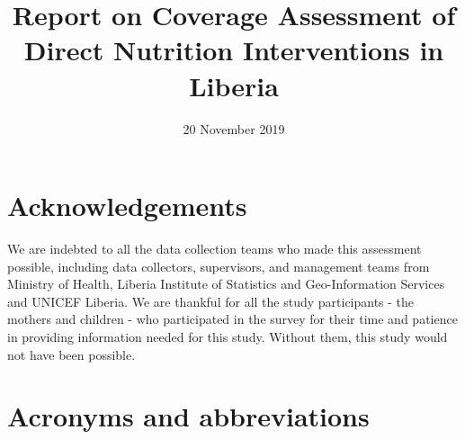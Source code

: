 \documentclass[12pt,a4paper]{article}
\title{Report on Coverage Assessment of Direct Nutrition Interventions in Liberia}
\author{}
\date{20 November 2019}
\begin{document}
\maketitle

\newpage 


{
\hypersetup{linkcolor=black}
\setcounter{tocdepth}{3}
\tableofcontents
}
\listoftables
\listoffigures
\newpage

\hypertarget{acknowledgements}{%
\section*{Acknowledgements}\label{acknowledgements}}

We are indebted to all the data collection teams who made this assessment possible, including data collectors, supervisors, and management teams from Ministry of Health, Liberia Institute of Statistics and Geo-Information Services and UNICEF Liberia. We are thankful for all the study participants - the mothers and children - who participated in the survey for their time and patience in providing information needed for this study. Without them, this study would not have been possible.

\newpage

\hypertarget{acronyms-and-abbreviations}{%
\section*{Acronyms and abbreviations}\label{acronyms-and-abbreviations}}
\end{document}
